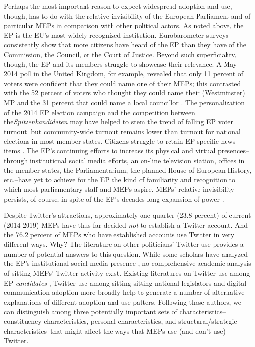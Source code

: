 \documentclass[12pt]{article}\usepackage[]{graphicx}\usepackage[]{color}
\begin{document}
		Perhaps the most important reason to expect widespread adoption and use, though, has to do with the relative invisibility of the European Parliament and of particular MEPs in comparison with other political actors. As noted above, the EP is the EU's most widely recognized institution. Eurobarometer surveys consistently show that more citizens have heard of the EP than they have of the Commission, the Council, or the Court of Justice. Beyond such superficiality, though, the EP and its members struggle to showcase their relevance. A May 2014 poll in the United Kingdom, for example, revealed that only 11 percent of voters were confident that they could name one of their MEPs; this contrasted with the 52 percent of voters who thought they could name their (Westminster) MP and the 31 percent that could name a local councillor \cite{coman.helm.2014}. The personalization of the 2014 EP election campaign and the competition between the\emph{Spitzenkandidaten} may have helped to stem the trend of falling EP voter turnout, but community-wide turnout remains lower than turnout for national elections in most member-states. Citizens struggle to retain EP-specific news items \cite{eurobarometer.2013}. The EP's continuing efforts to increase its physical and virtual presences--through institutional social media efforts, an on-line television station, offices in the member states, the Parliamentarium, the planned House of European History, etc.--have yet to achieve for the EP the kind of familiarity and recognition to which most parliamentary staff and MEPs aspire. MEPs' relative invisibility persists, of course, in spite of the EP's decades-long expansion of power \cite{corbett.jacobs.shackleton.2011, rittberger.2005}.
		
	Despite Twitter's attractions, approximately one quarter (23.8 percent) of current (2014-2019) MEPs have thus far decided \emph{not} to establish a Twitter account. And the 76.2 percent of MEPs who have established accounts use Twitter in very different ways. Why? The literature on other politicians' Twitter use provides a number of potential answers to this question. While some scholars have analyzed the EP's institutional social media presence \cite{leston-bandeira.bender.2013}, no comprehensive academic analysis of sitting MEPs' Twitter activity exist. Existing literatures on Twitter use among EP \emph{candidates} \cite{vergeer.hermans.sams.2011,vergeer.hermans.sams.2013}, Twitter use among sitting sitting national legislators \cite{ausserhoffer.maireder.2013, chi.yang.2011, glassman.straus.shogan.2013, larsson.kalsnes.2014, peterson.2012, shogan.2010} and digital communication adoption more broadly \cite{adler.gent.overmeyer.1998, chen.2010, gibson.rommele.2001, gibson.ward.2009, hargittai.2007, hernnson.stokes-brown.hindman.2007, williams.gulati.2010, williams.gulati.2011, wei.lo.2006} help to generate a number of alternative explanations of different adoption and use patters. Following these authors, we can distinguish among three potentially important sets of characteristics--constituency characteristics, personal characteristics, and structural/strategic characteristics--that might affect the ways that MEPs use (and don't use) Twitter.
    
\end{document}
